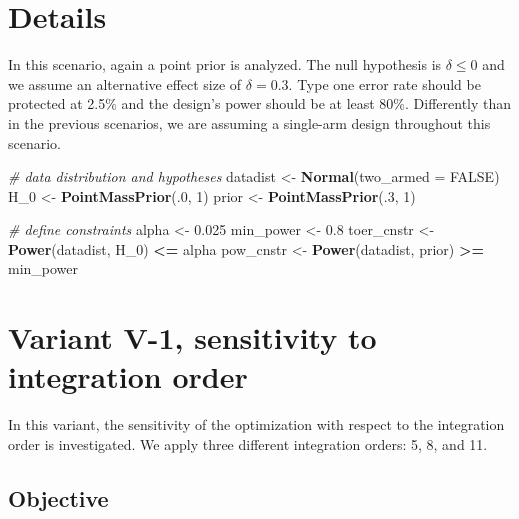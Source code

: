 \documentclass[
]{book}
\newenvironment{Shaded}{\begin{snugshade}}{\end{snugshade}}
\newcommand{\CommentTok}[1]{\textcolor[rgb]{0.56,0.35,0.01}{\textit{#1}}}
\newcommand{\DataTypeTok}[1]{\textcolor[rgb]{0.13,0.29,0.53}{#1}}
\newcommand{\DecValTok}[1]{\textcolor[rgb]{0.00,0.00,0.81}{#1}}
\newcommand{\FloatTok}[1]{\textcolor[rgb]{0.00,0.00,0.81}{#1}}
\newcommand{\KeywordTok}[1]{\textcolor[rgb]{0.13,0.29,0.53}{\textbf{#1}}}
\newcommand{\NormalTok}[1]{#1}
\newcommand{\OperatorTok}[1]{\textcolor[rgb]{0.81,0.36,0.00}{\textbf{#1}}}
\newcommand{\OtherTok}[1]{\textcolor[rgb]{0.56,0.35,0.01}{#1}}
\newcommand{\StringTok}[1]{\textcolor[rgb]{0.31,0.60,0.02}{#1}}
\begin{document}
\hypertarget{details-4}{%
\section{Details}\label{details-4}}

In this scenario, again a point prior is analyzed.
The null hypothesis is \(\delta \leq 0\) and we assume an alternative effect size
of \(\delta = 0.3\).
Type one error rate should be protected at 2.5\% and the design's power should
be at least 80\%.
Differently than in the previous scenarios, we are assuming a single-arm
design throughout this scenario.

\begin{Shaded}
\begin{Highlighting}[]
\CommentTok{# data distribution and hypotheses}
\NormalTok{datadist   <-}\StringTok{ }\KeywordTok{Normal}\NormalTok{(}\DataTypeTok{two_armed =} \OtherTok{FALSE}\NormalTok{)}
\NormalTok{H_}\DecValTok{0}\NormalTok{        <-}\StringTok{ }\KeywordTok{PointMassPrior}\NormalTok{(.}\DecValTok{0}\NormalTok{, }\DecValTok{1}\NormalTok{)}
\NormalTok{prior      <-}\StringTok{ }\KeywordTok{PointMassPrior}\NormalTok{(.}\DecValTok{3}\NormalTok{, }\DecValTok{1}\NormalTok{)}

\CommentTok{# define constraints}
\NormalTok{alpha      <-}\StringTok{ }\FloatTok{0.025}
\NormalTok{min_power  <-}\StringTok{ }\FloatTok{0.8}
\NormalTok{toer_cnstr <-}\StringTok{ }\KeywordTok{Power}\NormalTok{(datadist, H_}\DecValTok{0}\NormalTok{)   }\OperatorTok{<=}\StringTok{ }\NormalTok{alpha}
\NormalTok{pow_cnstr  <-}\StringTok{ }\KeywordTok{Power}\NormalTok{(datadist, prior) }\OperatorTok{>=}\StringTok{ }\NormalTok{min_power}
\end{Highlighting}
\end{Shaded}

\hypertarget{variantV_1}{%
\section{Variant V-1, sensitivity to integration order}\label{variantV_1}}

In this variant, the sensitivity of the optimization with respect to the
integration order is investigated.
We apply three different integration orders: 5, 8, and 11.

\hypertarget{objective-10}{%
\subsection{Objective}\label{objective-10}}
\end{document}
